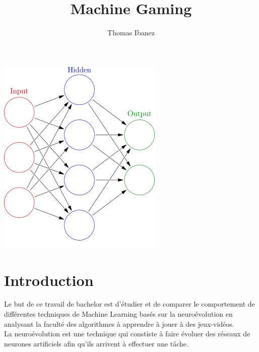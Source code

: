\documentclass{article}
\title{Machine Gaming}
\author{Thomas Ibanez}
\begin{document}
\maketitle
\bigskip
\bigskip
\bigskip
\bigskip
\bigskip
\bigskip
\bigskip

\begin{center}
\includegraphics[scale=1]{logo.png}
\end{center}

\newpage
\tableofcontents

\newpage

\section{Introduction}

Le but de ce travail de bachelor est d'étudier et de comparer le comportement de différentes techniques de Machine Learning basés sur la neuroévolution en analysant la faculté des algorithmes à apprendre à jouer à des jeux-vidéos.\\

La neuroévolution est une technique qui constiste à faire évoluer des réseaux de neurones artificiels afin qu'ils arrivent à effectuer une tâche.\\
\end{document}
